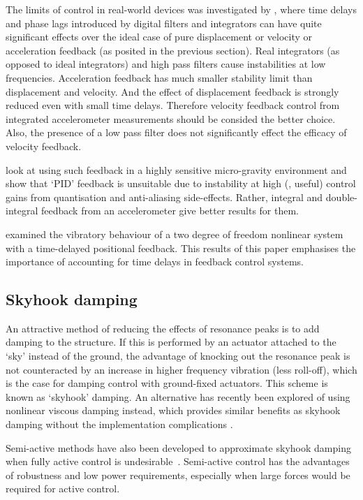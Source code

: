 The limits of control in real-world devices was investigated by \textcite{ananthaganeshan2001}, where time delays and phase lags introduced by digital filters and integrators can have quite significant effects over the ideal case of pure displacement or velocity or acceleration feedback (as posited in the previous section).
Real integrators (as opposed to ideal integrators) and high pass filters cause instabilities at low frequencies.
Acceleration feedback has much smaller stability limit than displacement and velocity.
And the effect of displacement feedback is strongly reduced even with small time delays.
Therefore velocity feedback control from integrated accelerometer measurements should be consided the better choice.
Also, the presence of a low pass filter does not significantly effect the efficacy of velocity feedback.

\textcite{zhu2006} look at using such feedback in a highly sensitive micro-gravity environment and show that `PID' feedback is unsuitable due to instability at high (\ie, useful) control gains from quantisation and anti-aliasing side-effects.
Rather, integral and double-integral feedback from an accelerometer give better results for them.

\textcite{zhao2007} examined the vibratory behaviour of a two degree of freedom nonlinear system with a time-delayed positional feedback.
This results of this paper emphasises the importance of accounting for time delays in feedback control systems.


\subsection{Skyhook damping}

An attractive method of reducing the effects of resonance peaks is to add damping to the structure.
If this is performed by an actuator attached to the `sky' instead of the ground, the advantage of knocking out the resonance peak is not counteracted by an increase in higher frequency vibration (less roll-off), which is the case for damping control with ground-fixed actuators.
This scheme is known as `skyhook' damping.
An alternative has recently been explored of using nonlinear viscous damping instead, which provides similar benefits as skyhook damping without the implementation complications \cite{lang2009}.

Semi-active methods have also been developed to approximate skyhook damping when fully active control is undesirable~\cite{liu2002,liu2005,ahmadian2004}.
Semi-active control has the advantages of robustness and low power requirements, especially when large forces would be required for active control.

